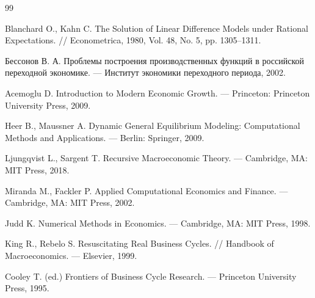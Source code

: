 \documentclass[12pt,a4paper]{report}   %
\begin{document}
        \begin{thebibliography}{99}

        Blanchard O., Kahn C. The Solution of Linear Difference Models under Rational Expectations. // Econometrica, 1980, Vol. 48, No. 5, pp. 1305--1311.
        
        Бессонов В. А. Проблемы построения производственных функций в российской переходной экономике. — Институт экономики переходного периода, 2002.

        Acemoglu D. Introduction to Modern Economic Growth. — Princeton: Princeton University Press, 2009.

        Heer B., Maussner A. Dynamic General Equilibrium Modeling: Computational Methods and Applications. — Berlin: Springer, 2009.

        Ljungqvist L., Sargent T. Recursive Macroeconomic Theory. — Cambridge, MA: MIT Press, 2018.

        Miranda M., Fackler P. Applied Computational Economics and Finance. — Cambridge, MA: MIT Press, 2002.

        Judd K. Numerical Methods in Economics. — Cambridge, MA: MIT Press, 1998.

        King R., Rebelo S. Resuscitating Real Business Cycles. // Handbook of Macroeconomics. — Elsevier, 1999.

        Cooley T. (ed.) Frontiers of Business Cycle Research. — Princeton University Press, 1995.

        \end{thebibliography}
\end{document}
